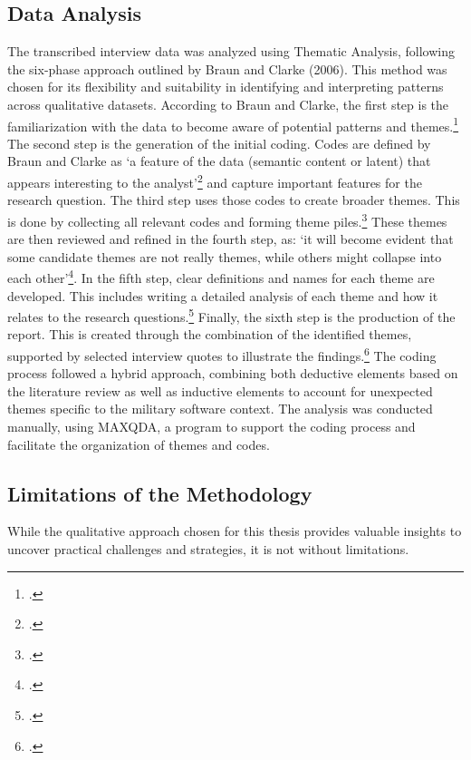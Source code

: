 \subsection{Data Analysis}
The transcribed interview data was analyzed using Thematic Analysis, following the six-phase approach outlined by Braun and Clarke (2006). This method was chosen for its flexibility and suitability in identifying and interpreting patterns across qualitative datasets.
According to Braun and Clarke, the first step is the familiarization with the data to become aware of potential patterns and themes.\footcite[16]{braunUsingThematicAnalysis2006} The second step is the generation of the initial coding. Codes are defined by Braun and Clarke as
`a feature of the data  (semantic content or latent) that appears interesting to the analyst'\footcite[18]{braunUsingThematicAnalysis2006} and capture important features for the research question. The third step uses those codes to create broader themes. This is done 
by collecting all relevant codes and forming theme piles.\footcite[19-20]{braunUsingThematicAnalysis2006} These themes are then reviewed and refined in the fourth step, as: `it will become evident that some candidate themes are not really  themes, while  others might collapse into each other'\footcite[20]{braunUsingThematicAnalysis2006}.
In the fifth step, clear definitions and names for each theme are developed. This includes writing a detailed analysis of each theme and how it relates to the research questions.\footcite[22]{braunUsingThematicAnalysis2006} 
Finally, the sixth step is the production of the report. This is created through the combination of the identified themes, supported by selected interview quotes to illustrate the findings.\footcite[23]{braunUsingThematicAnalysis2006}
The coding process followed a hybrid approach, combining both deductive elements based on the literature review as well as inductive elements to account for unexpected themes specific to the military software context. The analysis was conducted manually, using MAXQDA, a program to support the coding process and facilitate the organization of themes and codes.\\
\subsection{Limitations of the Methodology}
While the qualitative approach chosen for this thesis provides valuable insights to uncover practical challenges and strategies, it is not without limitations.\\

